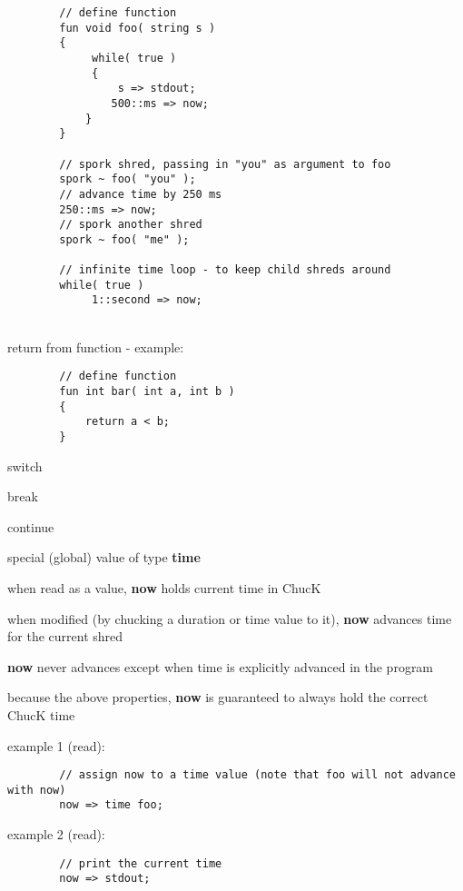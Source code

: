 \begin{verbatim}
        // define function
        fun void foo( string s )
        {
             while( true )
             {
                 s => stdout;
                500::ms => now;
            }
        }
   
        // spork shred, passing in "you" as argument to foo
        spork ~ foo( "you" );
        // advance time by 250 ms
        250::ms => now;
        // spork another shred
        spork ~ foo( "me" );
   
        // infinite time loop - to keep child shreds around
        while( true )
             1::second => now;
\end{verbatim}

\\
return from function - example:
\begin{verbatim}
        // define function
        fun int bar( int a, int b )
        {
            return a < b;
        }
\end{verbatim}

\begin{chuckitemize}
\item switch
\item break
\item continue
\end{chuckitemize}




\begin{chuckitemize}
\item special (global) value of type {\bf time}
\item when read as a value, {\bf now} holds current time in ChucK
\item when modified (by chucking a duration or time value to it), {\bf now} advances time for the current shred
\item {\bf now} never advances except when time is explicitly advanced in the program
\item because the above properties, {\bf now} is guaranteed to always hold the correct ChucK time
\end{chuckitemize}

example 1 (read):
\begin{verbatim}
        // assign now to a time value (note that foo will not advance with now)
        now => time foo;
\end{verbatim}

example 2 (read):
\begin{verbatim}
        // print the current time
        now => stdout;
\end{verbatim}

